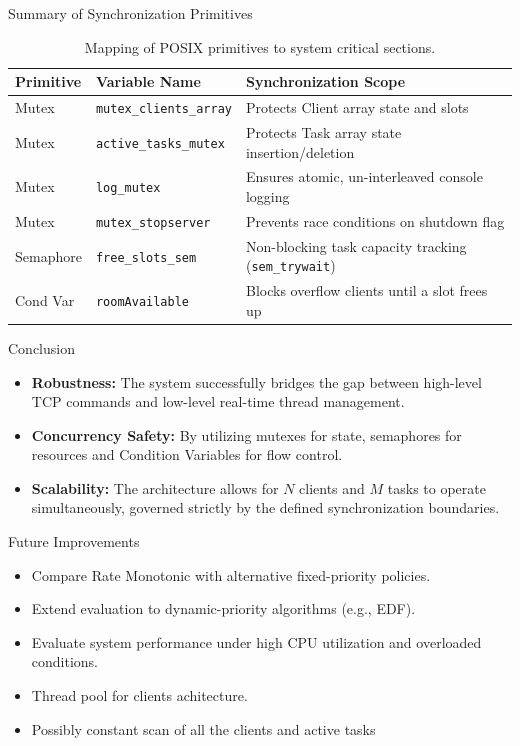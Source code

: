 \begin{frame}{Summary of Synchronization Primitives}
    \begin{table}
        \centering
        \small
        \begin{tabular}{|l|l|l|}
        \hline
        \textbf{Primitive} & \textbf{Variable Name} & \textbf{Synchronization Scope} \\ \hline
        Mutex & \texttt{mutex\_clients\_array} & Protects Client array state and slots \\ \hline
        Mutex & \texttt{active\_tasks\_mutex} & Protects Task array state insertion/deletion \\ \hline
        Mutex & \texttt{log\_mutex} & Ensures atomic, un-interleaved console logging \\ \hline
        Mutex & \texttt{mutex\_stopserver} & Prevents race conditions on shutdown flag \\ \hline
        Semaphore & \texttt{free\_slots\_sem} & Non-blocking task capacity tracking (\texttt{sem\_trywait}) \\ \hline
        Cond Var & \texttt{roomAvailable} & Blocks overflow clients until a slot frees up \\ \hline
        \end{tabular}
        \caption{Mapping of POSIX primitives to system critical sections.}
    \end{table}
\end{frame}

\begin{frame}{Conclusion}
    \begin{itemize}
        \item \textbf{Robustness:} The system successfully bridges the gap between high-level TCP commands and low-level real-time thread management.
        \item \textbf{Concurrency Safety:} By utilizing mutexes for state, semaphores for resources and Condition Variables for flow control.
        \item \textbf{Scalability:} The architecture allows for $N$ clients and $M$ tasks to operate simultaneously, governed strictly by the defined synchronization boundaries.
    \end{itemize}
\end{frame}

\begin{frame}{Future Improvements}
    \begin{itemize}
        \item Compare Rate Monotonic with alternative fixed-priority policies.
        \item Extend evaluation to dynamic-priority algorithms (e.g., EDF).
        \item Evaluate system performance under high CPU utilization and overloaded conditions.
        \item Thread pool for clients achitecture.
        \item Possibly constant scan of all the clients and active tasks
    \end{itemize}
\end{frame}